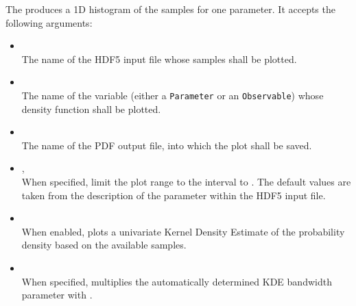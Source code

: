 The  produces a 1D histogram of the samples for one parameter.
It accepts the following arguments:
\begin{itemize}
    \item[] \\[\medskipamount]
        The name of the HDF5 input file whose samples shall be plotted.

    \item[] \\[\medskipamount]
        The name of the variable (either a \texttt{Parameter} or an \texttt{Observable}) whose
        density function shall be plotted.

    \item[] \\[\medskipamount]
        The name of the PDF output file, into which the plot shall be saved.

    \item[] , \\[\medskipamount]
        When specified, limit the plot range to the interval  to .
        The default values are taken from the description of the parameter within the
        HDF5 input file.

    \item[] \\[\medskipamount]
        When enabled, plots a univariate Kernel Density Estimate of the probability
        density based on the available samples.

    \item[] \\[\medskipamount]
        When specified, multiplies the automatically determined KDE bandwidth parameter
        with .
\end{itemize}

